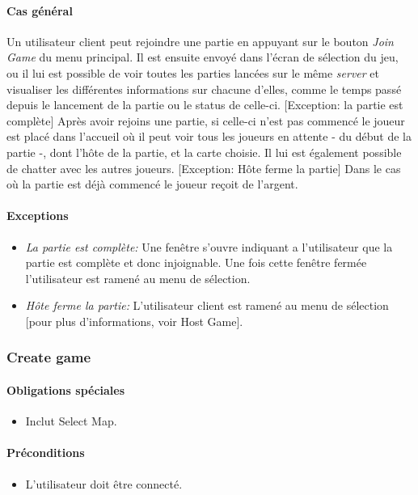 \documentclass[a4paper,11pt]{report}
\begin{document}
\paragraph{Cas général}
Un utilisateur client peut rejoindre une partie en appuyant sur le bouton \og \textit{Join Game} \fg 
du menu principal.
Il est ensuite envoyé dans l'écran de sélection du jeu, ou il lui est possible de voir toutes les parties lancées sur le
même \textit{server} et visualiser les différentes informations sur chacune d'elles, comme le temps passé depuis le lancement
de la partie ou le status de celle-ci.
[Exception: la partie est complète]
Après avoir rejoins une partie, si celle-ci n'est pas commencé le joueur est placé dans l’accueil où il peut
voir tous les joueurs en attente - du début de la partie -, dont l’hôte de la partie, et la carte choisie. Il lui
est également possible de chatter avec les autres joueurs. 
[Exception: Hôte ferme la partie]
Dans le cas où la partie est déjà commencé le joueur reçoit de l'argent.
\paragraph{Exceptions}
\begin{itemize}
 \item \textit{La partie est complète:} Une fenêtre s'ouvre indiquant a l'utilisateur que la partie est complète
 et donc injoignable. Une fois cette fenêtre fermée l'utilisateur est ramené au menu de sélection.
 \item \textit{Hôte ferme la partie:} L'utilisateur client est ramené au menu de sélection [pour plus d'informations, voir
 Host Game]. 
\end{itemize}

\subsubsection{Create game}
\paragraph{Obligations spéciales}
\begin{itemize}
 \item Inclut Select Map.
\end{itemize}
\paragraph{Préconditions}
\begin{itemize}
 \item L'utilisateur doit être connecté.
\end{itemize}
\end{document}
